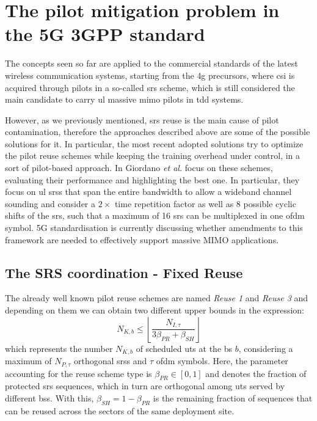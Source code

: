 \documentclass[11pt]{book}
\begin{document}
\section{The pilot mitigation problem in the 5G 3GPP standard}
The concepts seen so far are applied to the commercial standards of the latest wireless communication systems, starting from the \gls{4g} precursors, where \gls{csi} is acquired through pilots in a so-called \gls{srs} scheme, which is still considered the main candidate to carry \gls{ul} massive \gls{mimo} pilots in \gls{tdd} systems.

However, as we previously mentioned, \gls{srs} reuse is the main cause of pilot contamination, therefore the approaches described above are some of the possible solutions for it. In particular, the most recent adopted solutions try to optimize the pilot reuse schemes while keeping the training overhead under control, in a sort of pilot-based approach. In \cite{Giordano} Giordano \textit{et al.} focus on these schemes, evaluating their performance and highlighting the best one. In particular, they focus on \gls{ul} \gls{srs}s that span the entire bandwidth to allow a wideband channel sounding and consider a $2\times$ time repetition factor as well as 8 possible cyclic shifts of the \gls{srs}, such that a maximum of 16 \gls{srs} can be multiplexed in one \gls{ofdm} symbol. 5G standardisation is currently discussing whether amendments to this framework are needed to effectively support massive MIMO applications.

\subsection{The SRS coordination - Fixed Reuse}
The already well known pilot reuse schemes are named \textit{Reuse 1} and \textit{Reuse 3} and depending on them we can obtain two different upper bounds in the expression:
\begin{equation}
  N_{K,b} \leq \left\lfloor \frac{N_{I,\tau}}{3\beta_{PR}+\beta_{SH}} \right\rfloor
\end{equation}
which represents the number $N_{K,b}$ of scheduled \gls{ut}s at the \gls{bs} $b$, considering a maximum of $N_{P,\tau}$ orthogonal \gls{srs}s and $\tau$ \gls{ofdm} symbols. Here, the parameter accounting for the reuse scheme type is $\beta_{PR} \in [0,1]$ and denotes the fraction of protected \gls{srs} sequences, which in turn are orthogonal among \gls{ut}s served by different \gls{bs}s. With this, $\beta_{SH} = 1 - \beta_{PR}$ is the remaining fraction of sequences that can be reused across the sectors of the same deployment site.
\end{document}
